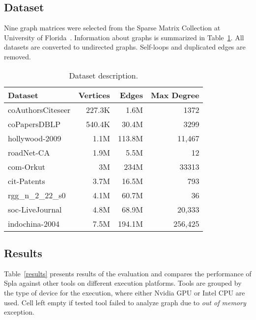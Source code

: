 \subsection{Dataset}

Nine graph matrices were selected from the Sparse Matrix Collection at University of Florida~\cite{dataset:10.1145/2049662.2049663}. 
Information about graphs is summarized in Table~\ref{dataset:info}. 
All datasets are converted to undirected graphs. 
Self-loops and duplicated edges are removed.

\begin{table}[htbp]
\caption{Dataset description.} 
\begin{center}
    \begin{tabular}{|l|r|r|r|}
    \hline
    Dataset & Vertices  & Edges & Max Degree \\
    \hline
    \hline
    coAuthorsCiteseer & 227.3K &   1.6M &    1372 \\
    coPapersDBLP      & 540.4K &  30.4M &    3299 \\
    hollywood-2009    &   1.1M & 113.8M &  11,467 \\
    roadNet-CA        &   1.9M &   5.5M &      12 \\
    com-Orkut         &     3M &   234M &   33313 \\
    cit-Patents       &   3.7M &  16.5M &     793 \\
    rgg\_n\_2\_22\_s0 &   4.1M &  60.7M &      36 \\
    soc-LiveJournal   &   4.8M &  68.9M &  20,333 \\
    indochina-2004    &   7.5M & 194.1M & 256,425 \\
    \hline
    \end{tabular}
    \label{dataset:info}
\end{center}
\end{table}

\subsection{Results}

Table~\ref{results} presents results of the evaluation and compares the performance of Spla against other tools on different execution platforms.
Tools are grouped by the type of device for the execution, where either Nvidia GPU or Intel CPU are used. 
Cell left empty if tested tool failed to analyze graph due to \textit{out of memory} exception.

